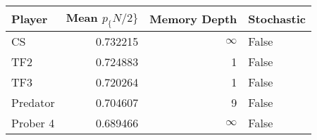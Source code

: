 \begin{tabular}{lrrl}
\toprule
   Player &  Mean $p_\{N/2\}$ &  Memory Depth & Stochastic \\
\midrule
       CS &        0.732215 &            \(\infty\) &      False \\
      TF2 &        0.724883 &             1 &      False \\
      TF3 &        0.720264 &             1 &      False \\
 Predator &        0.704607 &             9 &      False \\
 Prober 4 &        0.689466 &            \(\infty\) &      False \\
\bottomrule
\end{tabular}
